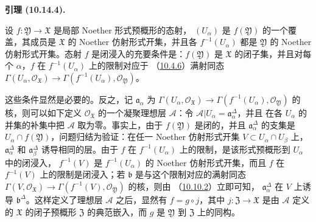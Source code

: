 \documentclass[UTF8,fontset=none,11pt,oneside,openany]{ctexbook}
\newenvironment{lemma}[1][]{%
  \par\medskip\noindent\textbf{引理 (#1).}\ %
}{\par}
\let\EGAOriginalLabel\label
\renewcommand{\label}[1]{\phantomsection\EGAOriginalLabel{#1}}
\begin{document}
\begin{lemma}[10.14.4]
\label{I.10.14.4-fr}
设 $f:\mathfrak{Y}\to\mathfrak{X}$ 是局部 Noether 形式预概形的态射，
$(U_\alpha)$ 是 $f(\mathfrak{Y})$ 的一个覆盖，其成员是
$\mathfrak{X}$ 的 Noether 仿射形式开集，并且各
$f^{-1}(U_\alpha)$ 都是 $\mathfrak{Y}$ 的 Noether 仿射形式开集。态射
$f$ 是闭浸入的充要条件是：$f(\mathfrak{Y})$ 是 $\mathfrak{X}$ 的闭子集，并且对每个
$\alpha$，$f$ 在 $f^{-1}(U_\alpha)$ 上的限制对应于
（\hyperref[I.10.4.6-fr]{10.4.6}）满射同态
$\Gamma(U_\alpha,\mathscr{O}_{\mathfrak{X}})\to
\Gamma(f^{-1}(U_\alpha),\mathscr{O}_{\mathfrak{Y}})$。
\end{lemma}

这些条件显然是必要的。反之，记
$\mathfrak{a}_\alpha$ 为
$\Gamma(U_\alpha,\mathscr{O}_{\mathfrak{X}})\to
\Gamma(f^{-1}(U_\alpha),\mathscr{O}_{\mathfrak{Y}})$ 的核，则可以如下定义
$\mathscr{O}_{\mathfrak{X}}$ 的一个凝聚理想层 $\mathscr{A}$：令
$\mathscr{A}|U_\alpha=\mathfrak{a}_\alpha^\Delta$，并且
在各 $U_\alpha$ 的并集的补集中把 $\mathscr{A}$ 取为零。事实上，由于
$f(\mathfrak{Y})$ 是闭的，并且
$\mathfrak{a}_\alpha^\Delta$ 的支集是
$U_\alpha\cap f(\mathfrak{Y})$，问题归结为验证：在任一 Noether 仿射形式开集
$V\subset U_\alpha\cap U_\beta$ 上，$\mathfrak{a}_\alpha^\Delta$ 和
$\mathfrak{a}_\beta^\Delta$ 诱导相同的层。由于 $f$ 在
$f^{-1}(U_\alpha)$ 上的限制，是该形式预概形到 $U_\alpha$ 中的闭浸入，
$f^{-1}(V)$ 是 $f^{-1}(U_\alpha)$ 的 Noether 仿射形式开集，而且 $f$ 在
$f^{-1}(V)$ 上的限制是闭浸入；若 $\mathfrak{b}$ 是与这个限制对应的满射同态
$\Gamma(V,\mathscr{O}_{\mathfrak{X}})\to
\Gamma(f^{-1}(V),\mathscr{O}_{\mathfrak{Y}})$ 的核，则由
（\hyperref[I.10.10.2-fr]{10.10.2}）立即可知，
$\mathfrak{a}_\alpha^\Delta$ 在 $V$ 上诱导 $\mathfrak{b}^\Delta$。这样定义了理想层
$\mathscr{A}$ 之后，显然有
$f=g\circ j$，其中 $j:\mathfrak{Z}\to\mathfrak{X}$ 是由 $\mathscr{A}$ 定义的
$\mathfrak{X}$ 的闭子预概形 $\mathfrak{Z}$ 的典范嵌入，而 $g$ 是
$\mathfrak{Y}$ 到 $\mathfrak{Z}$ 上的同构。
\end{document}
